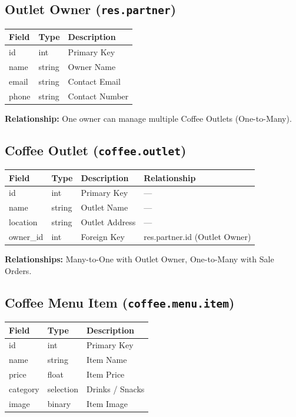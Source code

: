 \subsection*{Outlet Owner (\texttt{res.partner})}
\begin{tabular}{|l|l|l|}
\hline
\textbf{Field} & \textbf{Type} & \textbf{Description} \\
\hline
id & int & Primary Key \\
name & string & Owner Name \\
email & string & Contact Email \\
phone & string & Contact Number \\
\hline
\end{tabular}

\noindent
\textbf{Relationship:} One owner can manage multiple Coffee Outlets (One-to-Many).

\subsection*{Coffee Outlet (\texttt{coffee.outlet})}
\begin{tabular}{|l|l|l|l|}
\hline
\textbf{Field} & \textbf{Type} & \textbf{Description} & \textbf{Relationship} \\
\hline
id & int & Primary Key & — \\
name & string & Outlet Name & — \\
location & string & Outlet Address & — \\
owner\_id & int & Foreign Key & res.partner.id (Outlet Owner) \\
\hline
\end{tabular}

\noindent
\textbf{Relationships:} Many-to-One with Outlet Owner, One-to-Many with Sale Orders.

\subsection*{Coffee Menu Item (\texttt{coffee.menu.item})}
\begin{tabular}{|l|l|l|}
\hline
\textbf{Field} & \textbf{Type} & \textbf{Description} \\
\hline
id & int & Primary Key \\
name & string & Item Name \\
price & float & Item Price \\
category & selection & Drinks / Snacks \\
image & binary & Item Image \\
\hline
\end{tabular}

